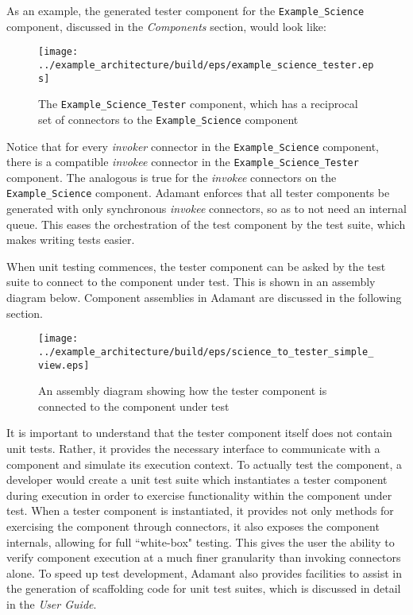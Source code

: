 As an example, the generated tester component for the \texttt{Example\_Science} component, discussed in the \textit{Components} section, would look like:

\begin{figure}[H]
  \texttt{[image: ../example\_architecture/build/eps/example\_science\_tester.eps]}
  \caption{The \texttt{Example\_Science\_Tester} component, which has a reciprocal set of connectors to the \texttt{Example\_Science} component}
\end{figure}

Notice that for every \textit{invoker} connector in the \texttt{Example\_Science} component, there is a compatible \textit{invokee} connector in the \texttt{Example\_Science\_Tester} component. The analogous is true for the \textit{invokee} connectors on the \texttt{Example\_Science} component. Adamant enforces that all tester components be generated with only synchronous \textit{invokee} connectors, so as to not need an internal queue. This eases the orchestration of the test component by the test suite, which makes writing tests easier.

When unit testing commences, the tester component can be asked by the test suite to connect to the component under test. This is shown in an assembly diagram below. Component assemblies in Adamant are discussed in the following section.

\begin{figure}[H]
  \texttt{[image: ../example\_architecture/build/eps/science\_to\_tester\_simple\_view.eps]}
  \caption{An assembly diagram showing how the tester component is connected to the component under test}
\end{figure}

It is important to understand that the tester component itself does not contain unit tests. Rather, it provides the necessary interface to communicate with a component and simulate its execution context. To actually test the component, a developer would create a unit test suite which instantiates a tester component during execution in order to exercise functionality within the component under test. When a tester component is instantiated, it provides not only methods for exercising the component through connectors, it also exposes the component internals, allowing for full ``white-box" testing. This gives the user the ability to verify component execution at a much finer granularity than invoking connectors alone. To speed up test development, Adamant also provides facilities to assist in the generation of scaffolding code for unit test suites, which is discussed in detail in the \textit{User Guide}.

